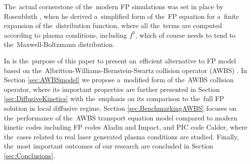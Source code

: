 
The~actual cornerstone of the~modern FP simulations was set in place
by Rosenbluth \cite{Rosenbluth_PR1957}, when he derived a~simplified form 
of the~FP equation for a~finite expansion of the~distribution function,
where all the~terms are computed according to plasma conditions, including
$f^0$, which of course needs to tend to the~Maxwell-Boltzmann distribution.

In is the~purpose of this paper to present an~efficient alternative 
to FP model based on the~Albritton-Williams-Bernstein-Swartz 
collision operator (AWBS) \cite{AWBS_PRL1986}.
In Section \ref{sec:AWBSmodel} we propose a~modified form of 
the~AWBS collision operator, where its important properties are further
presented in Section \ref{sec:DiffusiveKinetics} with the~emphasis on its
comparison to the~full FP solution in local diffusive regime. 
Section \ref{sec:BenchmarkingAWBS} focuses on the~performance of the~AWBS 
transport equation model compared to modern kinetic codes including FP codes
Aladin and Impact, and PIC code Calder, where the~cases related to real
laser generated plasma conditions are studied. Finally, the~most important
outcomes of our research are concluded in Section \ref{sec:Conclusions}. 
